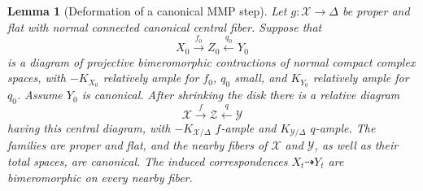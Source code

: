 \documentclass[11pt,a4paper]{article}
\numberwithin{equation}{section}
\newtheorem{lemma}[theorem]{Lemma}
\theoremstyle{definition}
\theoremstyle{remark}
\begin{document}
\begin{lemma}[Deformation of a canonical MMP step]
\label{lem:deform-mixed}
Let $g:\mathcal X\to\Delta$ be proper and flat with normal connected
canonical central fiber. Suppose that
\[
 X_0\xrightarrow{f_0}Z_0\xleftarrow{q_0}Y_0
\]
is a diagram of projective bimeromorphic contractions of normal
compact complex spaces, with $-K_{X_0}$ relatively ample for $f_0$,
$q_0$ small, and $K_{Y_0}$ relatively ample for $q_0$.
Assume $Y_0$ is canonical. After shrinking the disk there is a
relative diagram
\[
 \mathcal X\xrightarrow{f}\mathcal Z\xleftarrow{q}\mathcal Y
\]
having this central diagram, with $-K_{\mathcal X/\Delta}$
$f$-ample and $K_{\mathcal Y/\Delta}$ $q$-ample. The families are
proper and flat, and the nearby fibers of $\mathcal X$ and
$\mathcal Y$, as well as their total spaces, are canonical.
The induced correspondences $X_t\dashrightarrow Y_t$ are
bimeromorphic on every nearby fiber.
\end{lemma}
\end{document}
